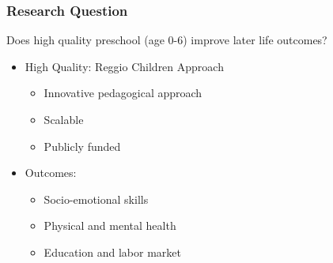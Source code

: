 \begin{frame}
\frametitle{Research Question} 

\begin{block}{}
Does high quality preschool (age 0-6) improve later life outcomes?
\end{block}

\vspace{2ex}

\begin{itemize}
	\item High Quality: Reggio Children Approach
	\begin{itemize}
		\item Innovative pedagogical approach
		\item Scalable
		\item Publicly funded
	\end{itemize}
	\vspace{1.5ex}
	\item Outcomes:
	\begin{itemize}
		\item Socio-emotional skills
		\item Physical and mental health
		\item Education and labor market
	\end{itemize}
\end{itemize}
\vspace{10ex}

\end{frame} 

